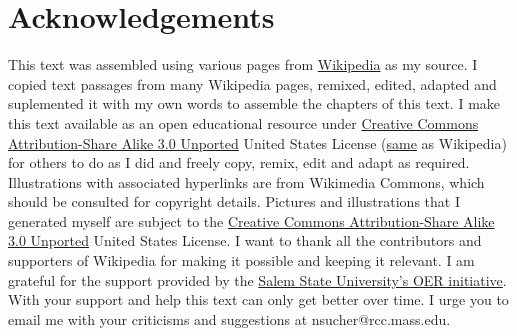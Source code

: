 \hypertarget{acknowledgements}{%
\section*{Acknowledgements}\label{acknowledgements}}

\begin{multicols}{2}

This text was assembled using various pages from
\href{https://www.wikipedia.org}{Wikipedia} as my source. I copied text
passages from many Wikipedia pages, remixed, edited, adapted and
suplemented it with my own words to assemble the chapters of this text.
I make this text available as an open educational resource under
\href{https://creativecommons.org/licenses/by-sa/3.0/deed.en}{Creative
Commons Attribution-Share Alike 3.0 Unported} United States License
(\href{https://en.wikipedia.org/wiki/Wikipedia:Text_of_Creative_Commons_Attribution-ShareAlike_3.0_Unported_License}{same}
as Wikipedia) for others to do as I did and freely copy, remix, edit and
adapt as required. Illustrations with associated hyperlinks are from
Wikimedia Commons, which should be consulted for copyright details.
Pictures and illustrations that I generated myself are subject to the
\href{https://creativecommons.org/licenses/by-sa/3.0/deed.en}{Creative
Commons Attribution-Share Alike 3.0 Unported} United States License. I
want to thank all the contributors and supporters of Wikipedia for
making it possible and keeping it relevant.  I am grateful for the support provided by the \href{}{Salem State University's OER initiative}. With your support and help this text can
only get better over time. I urge you to email me with your criticisms
and suggestions at nsucher@rcc.mass.edu.


\end{multicols}

